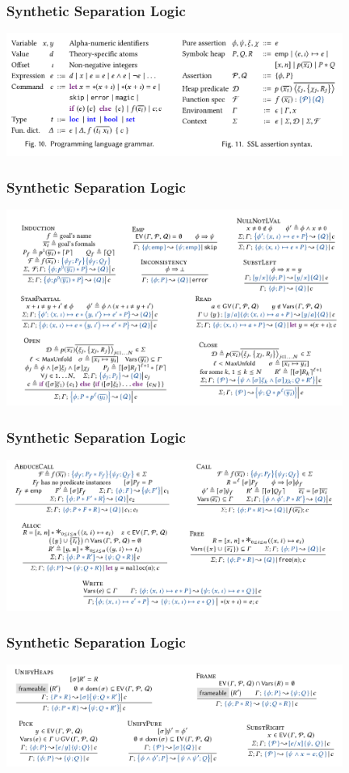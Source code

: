 \documentclass[french]{beamer}
\begin{document}
\begin{frame}[fragile]
	\frametitle{Synthetic Separation Logic}
	\includegraphics[width=11cm]{figures/syntax.png}
\end{frame}
\begin{frame}[fragile]
	\frametitle{Synthetic Separation Logic}
	\includegraphics[width=11cm]{figures/zoo1.png}
\end{frame}
\begin{frame}[fragile]
	\frametitle{Synthetic Separation Logic}
	\includegraphics[width=11cm]{figures/zoo2.png}
\end{frame}
\begin{frame}[fragile]
	\frametitle{Synthetic Separation Logic}
	\includegraphics[width=11cm]{figures/zoo3.png}
\end{frame}
\end{document}
